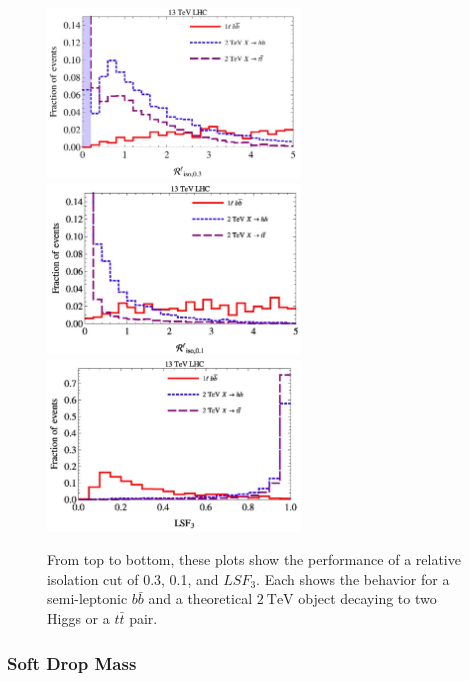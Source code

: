\begin{figure}[!tp]
    \centering
    \includegraphics[width=0.6\textwidth]{figures/RelIso0_3.png}
    \includegraphics[width=0.6\textwidth]{figures/RelIso0_1.png}
    \includegraphics[width=0.6\textwidth]{figures/LSF_paper_plot.png}
    \caption[
        LSF performance compared to relative isolation
    ]    
    {
        From top to bottom, these plots show the performance of a relative isolation cut of 0.3, 0.1, and $LSF_{3}$.  Each shows the behavior for a semi-leptonic \ensuremath{b\bar{b}} and a theoretical \ensuremath{\SI{2}{\TeV}} object decaying to two Higgs or a \ensuremath{t\bar{t}} pair.
    }
    \label{fig:LSFvRelIso}

\end{figure}

\subsubsection{Soft Drop Mass}

